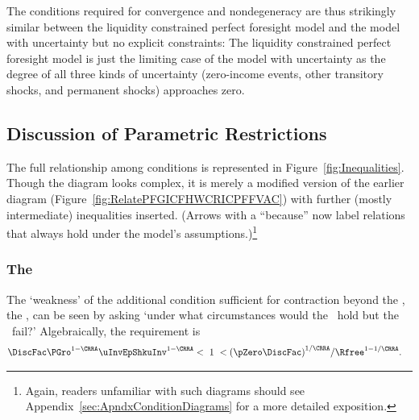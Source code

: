 \documentclass[BufferStockTheory]{subfiles}
\begin{document}
The conditions required for convergence and nondegeneracy are thus strikingly similar between the liquidity constrained perfect foresight model and the model with uncertainty but no explicit constraints: The liquidity constrained perfect foresight model is just the limiting case of the model with uncertainty as the degree of all three kinds of uncertainty (zero-income events, other transitory shocks, and permanent shocks) approaches zero.


\hypertarget{Discussion-of-Parametric-Restrictions}{}
\subsection{Discussion of Parametric Restrictions}\label{sec:discussConvergence}

The full relationship among conditions is represented in Figure~\ref{fig:Inequalities}.  Though the diagram looks complex, it is merely a modified version of the earlier diagram (Figure~\ref{fig:RelatePFGICFHWCRICPFFVAC}) with further (mostly intermediate) inequalities inserted.  (Arrows with a ``because'' now label relations that always hold under the model's assumptions.)\footnote{Again, readers unfamiliar with such diagrams should see Appendix~\ref{sec:ApndxConditionDiagrams} for a more detailed exposition.}

\renewcommand{\figName}{Inequalities} %
\renewcommand{\figFile}{\figName} %
\hypertarget{\figFile}{}

\subsubsection{The \WRIC}\label{subsubsec:WRICdiscuss}

The `weakness' of the additional condition sufficient for contraction beyond the {\FVAC}, the
\WRIC, can be seen by asking `under what circumstances
would the \FVAC~hold but the \WRIC~fail?'
Algebraically, the requirement is
\begin{align}
  \DiscFac \PGro^{1-\CRRA}\uInvEpShkuInv^{1-\CRRA} & < ~ 1 ~ <  {(\pZero \DiscFac)}^{1/\CRRA}/\Rfree^{1-1/\CRRA}. \label{eq:WRICandFVAC}
\end{align}
\end{document}
